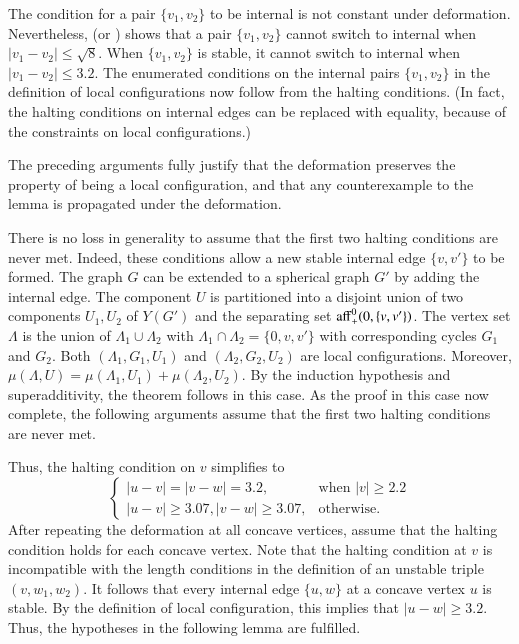 \documentclass{article} %
\begin{document}
The condition for a pair $\{v_1,v_2\}$ to be
internal is not constant under deformation.  Nevertheless,
\cite[p.23]{Hales:2002:Dodec} (or \cite[p.132]{Hales:2006:DCG}) 
shows that a pair $\{v_1,v_2\}$
cannot switch to internal when $|v_1-v_2| \le \sqrt8$.  When $\{v_1,v_2\}$ is stable,
it cannot switch to internal when $|v_1-v_2|\le 3.2$. 
The enumerated conditions on the
internal pairs $\{v_1,v_2\}$ in the definition of local configurations
now follow from the halting conditions. (In fact, the halting conditions on internal edges
can be replaced with equality, because of the
constraints on local configurations.)

The preceding arguments fully justify that the deformation preserves
the property of being a local configuration, and that
any counterexample to the lemma is propagated under
the deformation.


There is no loss in generality to assume that the first two halting conditions are never
met.  Indeed, these conditions allow a new stable internal edge $\{v,v'\}$ to be formed.  The
graph $G$ can be extended to a spherical graph $G'$ by adding the internal edge.
The component $U$ is partitioned into a disjoint union of two components $U_1,U_2$ 
of $Y(G')$ and the separating set ${\operatorname{aff}}_+^0(0,\{v,v'\})$.  The vertex set
$\Lambda$ is the union of $\Lambda_1\cup\Lambda_2$ with $\Lambda_1\cap\Lambda_2=\{0,v,v'\}$
with corresponding cycles $G_1$ and $G_2$.  Both $(\Lambda_1,G_1,U_1)$ and $(\Lambda_2,G_2,U_2)$ are local configurations.  Moreover, $\mu(\Lambda,U) = \mu(\Lambda_1,U_1)+\mu(\Lambda_2,U_2)$.  By the induction hypothesis and superadditivity, the theorem follows in this case.
As the proof in this case now complete, the following arguments
assume that the first two halting conditions are never met.

Thus, the halting condition on $v$ simplifies to 
\begin{equation}\label{eqn:halt}
\begin{cases}
|u-v|=|v-w|=3.2,& \text{when } |v|\ge 2.2\\
|u-v|\ge 3.07, |v-w|\ge 3.07,& \text{otherwise.}
\end{cases}
\end{equation}
After repeating the deformation at all concave vertices, assume that the halting condition
holds for each concave vertex.  Note that the halting
condition at $v$ is incompatible with the length conditions in
the definition of an unstable triple $(v,w_1,w_2)$.  It
follows that every internal edge $\{u,w\}$
at a concave vertex $u$ is stable.  By the definition of local configuration, this
implies that $|u-w|\ge 3.2$.  Thus, the hypotheses in the following lemma are fulfilled.
\end{document}

